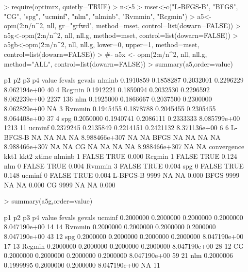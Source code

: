 \documentclass[11pt]{article}
\begin{document}
\begin{Schunk}
\begin{Sinput}
> require(optimrx, quietly=TRUE)
> n<-5
> mset<-c("L-BFGS-B", "BFGS", "CG", "spg", "ucminf", "nlm", "nlminb", "Rvmmin", "Rcgmin")
> a5<-opm(2:n/n^2, nll, gr="grfwd", method=mset, control=list(dowarn=FALSE))
> a5g<-opm(2:n/n^2, nll, nll.g, method=mset, control=list(dowarn=FALSE))
> a5gb<-opm(2:n/n^2, nll, nll.g, lower=0, upper=1, method=mset, control=list(dowarn=FALSE))
> #- a5x <- opm(2:n/n^2, nll, nll.g, method="ALL", control=list(dowarn=FALSE))
> summary(a5,order=value)
\end{Sinput}
\begin{Soutput}
                p1        p2        p3        p4         value fevals gevals
nlminb   0.1910859 0.1858287 0.2032001 0.2296229  8.062194e+00     40      4
Rcgmin   0.1912221 0.1859094 0.2032530 0.2296592  8.062239e+00   2237    136
nlm      0.1925000 0.1866667 0.2037500 0.2300000  8.062829e+00     NA      3
Rvmmin   0.1945455 0.1878788 0.2045455 0.2305455  8.064408e+00     37      4
spg      0.2050000 0.1940741 0.2086111 0.2333333  8.085799e+00   1213     11
ucminf   0.2379245 0.2135849 0.2214151 0.2421132  8.371136e+00      6      6
L-BFGS-B        NA        NA        NA        NA 8.988466e+307     NA     NA
BFGS            NA        NA        NA        NA 8.988466e+307     NA     NA
CG              NA        NA        NA        NA 8.988466e+307     NA     NA
         convergence  kkt1 kkt2 xtime
nlminb             1 FALSE TRUE 0.000
Rcgmin             1 FALSE TRUE 0.124
nlm                0 FALSE TRUE 0.004
Rvmmin             3 FALSE TRUE 0.004
spg                0 FALSE TRUE 0.148
ucminf             0 FALSE TRUE 0.004
L-BFGS-B        9999    NA   NA 0.000
BFGS            9999    NA   NA 0.000
CG              9999    NA   NA 0.000
\end{Soutput}
\begin{Sinput}
> summary(a5g,order=value)
\end{Sinput}
\begin{Soutput}
                p1        p2        p3        p4         value fevals gevals
ucminf   0.2000000 0.2000000 0.2000000 0.2000000  8.047190e+00     14     14
Rvmmin   0.2000000 0.2000000 0.2000000 0.2000000  8.047190e+00     43     12
spg      0.2000000 0.2000000 0.2000000 0.2000000  8.047190e+00     17     13
Rcgmin   0.2000000 0.2000000 0.2000000 0.2000000  8.047190e+00     28     12
CG       0.2000000 0.2000000 0.2000000 0.2000000  8.047190e+00     59     21
nlm      0.2000006 0.1999995 0.2000000 0.2000000  8.047190e+00     NA     11

\end{Soutput}
\end{Schunk}
\end{document}
